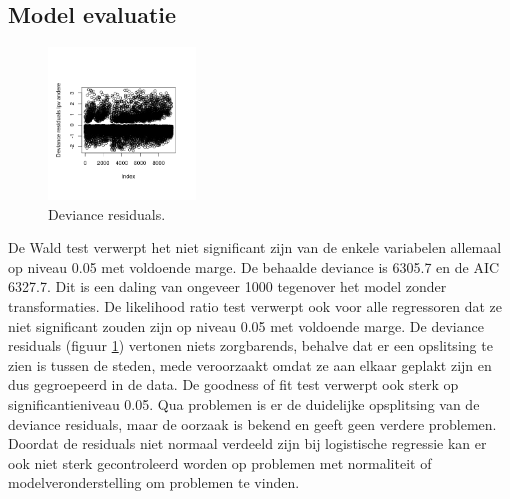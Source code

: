 \documentclass[a4paper,kulak]{kulakarticle} %
\begin{document}
\subsection{Model evaluatie}
\begin{figure}
	\begin{center}
		\includegraphics[width=0.35\textwidth]{Rplot.png}
	\end{center}
	\caption{Deviance residuals.}
	\label{fig:rpn}
\end{figure}
De Wald test verwerpt het niet significant zijn van de enkele variabelen allemaal op niveau 0.05 met voldoende marge.
De behaalde deviance is 6305.7 en de AIC 6327.7.
Dit is een daling van ongeveer 1000 tegenover het model zonder transformaties.
De likelihood ratio test verwerpt ook voor alle regressoren dat ze niet significant zouden zijn op niveau 0.05 met voldoende marge.
De deviance residuals (figuur \ref{fig:rpn}) vertonen niets zorgbarends, behalve dat er een opslitsing te zien is tussen de steden, mede veroorzaakt omdat ze aan elkaar geplakt zijn en dus gegroepeerd in de data.
De goodness of fit test verwerpt ook sterk op significantieniveau 0.05.
Qua problemen is er de duidelijke opsplitsing van de deviance residuals, maar de oorzaak is bekend en geeft geen verdere problemen.
Doordat de residuals niet normaal verdeeld zijn bij logistische regressie kan er ook niet sterk gecontroleerd worden op problemen met normaliteit of modelveronderstelling om problemen te vinden.
\end{document}
